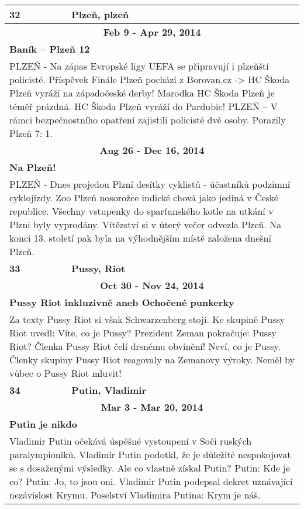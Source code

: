 \begin{tabularx}{\linewidth}{l l}
            \bf 32 & \bf Plzeň, plzeň \\ \midrule
            
                \multicolumn{2}{c}{\bf Feb 9 - Apr 29, 2014} \\
                \multicolumn{2}{p{\linewidth}}{\bf Baník – Plzeň 12} \\
                \multicolumn{2}{p{\linewidth}}{PLZEŇ - Na zápas Evropské ligy UEFA se připravují i plzeňští policisté. Příspěvek Finále Plzeň pochází z Borovan.cz -> HC Škoda Plzeň vyráží na západočeské derby! Marodka HC Škoda Plzeň je téměř prázdná. HC Škoda Plzeň vyráží do Pardubic! PLZEŇ – V rámci bezpečnostního opatření zajistili policisté dvě osoby. Porazily Plzeň 7: 1.} \\ \midrule
                
                \multicolumn{2}{c}{\bf Aug 26 - Dec 16, 2014} \\
                \multicolumn{2}{p{\linewidth}}{\bf Na Plzeň!} \\
                \multicolumn{2}{p{\linewidth}}{PLZEŇ - Dnes projedou Plzní desítky cyklistů - účastníků podzimní cyklojízdy. Zoo Plzeň nosorožce indické chová jako jediná v České republice. Všechny vstupenky do sparťanského kotle na utkání v Plzni byly vyprodány. Vítězství si v úterý večer odvezla Plzeň. Na konci 13. století pak byla na výhodnějším místě založena dnešní Plzeň.} \\ \midrule
                [1.5pt]

            \bf 33 & \bf Pussy, Riot \\ \midrule
            
                \multicolumn{2}{c}{\bf Oct 30 - Nov 24, 2014} \\
                \multicolumn{2}{p{\linewidth}}{\bf Pussy Riot inkluzivně aneb Ochočené punkerky} \\
                \multicolumn{2}{p{\linewidth}}{Za texty Pussy Riot si však Schwarzenberg stojí. Ke skupině Pussy Riot uvedl:  Víte, co je Pussy? Prezident Zeman pokračuje: Pussy Riot? Členka Pussy Riot čelí drsnému obvinění! Neví, co je Pussy. Členky skupiny Pussy Riot reagovaly na Zemanovy výroky.  Neměl by vůbec o Pussy Riot mluvit!} \\ \midrule
                [1.5pt]

            \bf 34 & \bf Putin, Vladimir \\ \midrule
            
                \multicolumn{2}{c}{\bf Mar 3 - Mar 20, 2014} \\
                \multicolumn{2}{p{\linewidth}}{\bf Putin je nikdo} \\
                \multicolumn{2}{p{\linewidth}}{Vladimir Putin očekává úspěšné vystoupení v Soči ruských paralympioniků. Vladimir Putin podotkl, že je důležité nespokojovat se s dosaženými výsledky. Ale co vlastně získal Putin? Putin: Kde je co? Putin: Jo, to jsou oni. Vladimir Putin podepsal dekret uznávající nezávislost Krymu. Poselství Vladimira Putina: Krym je náš.} \\ \midrule
                

\end{tabularx}
